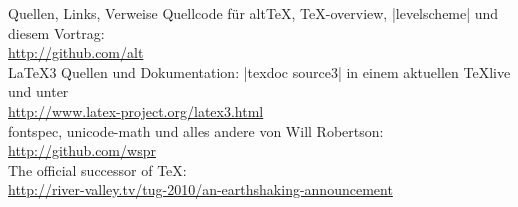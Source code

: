 \documentclass[t]{beamer}
\begin{document}
\begin{frame}{Quellen, Links, Verweise}
Quellcode für alt\TeX, \TeX-overview, |levelscheme| und diesem Vortrag:\\
\url{http://github.com/alt}\\
\LaTeX3 Quellen und Dokumentation: |texdoc source3| in einem aktuellen \TeX live und unter\\
\url{http://www.latex-project.org/latex3.html}\\
fontspec, unicode-math und alles andere von Will Robertson:\\
\url{http://github.com/wspr}\\
The official successor of \TeX:\\
\url{http://river-valley.tv/tug-2010/an-earthshaking-announcement}

\end{frame}
\end{document}
